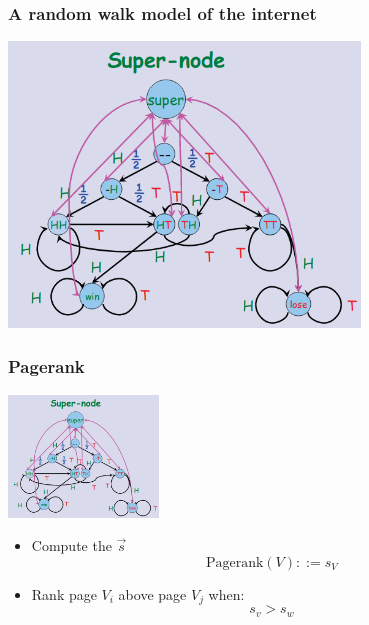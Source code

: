 \documentclass{beamer}
\begin{document}
\begin{frame}
  \frametitle{A random walk model of the internet}
  \begin{center}
    \includegraphics[width=0.7\textwidth]{../img/pagerank_supernode}
  \end{center}
\end{frame}

\begin{frame}
  \frametitle{Pagerank}

  \includegraphics[width=0.3\textwidth]{../img/pagerank_supernode}

  \bigskip

  {\larger
  \begin{itemize}
  \item Compute the  $\overrightarrow{s}$
    \begin{equation*}
      \text{Pagerank}(V) ::= s_V
    \end{equation*}
    \bigskip

  \item Rank page $V_i$ above page $V_j$ when:
    \begin{equation*}
      s_v > s_w
    \end{equation*}
  \end{itemize}
  }
\end{frame}
\end{document}
